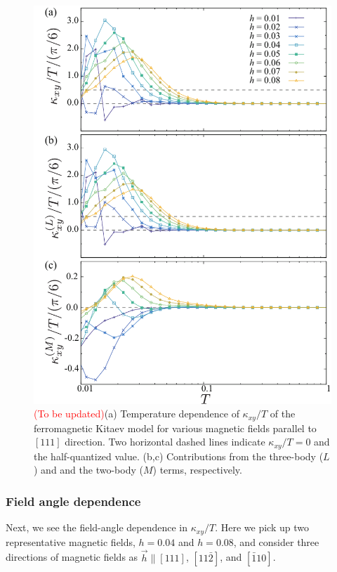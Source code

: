 \documentclass[reprint,amsmath,amssymb,aps,prx]{revtex4-2}
\begin{document}
\begin{figure}
  \begin{center}
    \includegraphics[width=0.9\linewidth]{Figs/plot_k_all.pdf}
  \end{center}
  \caption{\textcolor{red}{(To be updated)}(a) Temperature dependence of $\kappa_{xy}/T$ of the ferromagnetic Kitaev model for various magnetic fields parallel to $[111]$ direction. Two horizontal dashed lines indicate $\kappa_{xy}/T = 0$ and the half-quantized value. (b,c) Contributions from the three-body ($L$) and and the two-body ($M$) terms, respectively.}
  \label{fig:k_all_pure}
\end{figure}


   \subsubsection{Field angle dependence}
Next, we see the field-angle dependence in $\kappa_{xy}/T$. Here we pick up two representative magnetic fields, $h=0.04$ and $h=0.08$, and consider three directions of magnetic fields as $\vec{h} \parallel [111]$, $[11\bar{2}]$, and $[\bar{1}10]$. 
\end{document}
